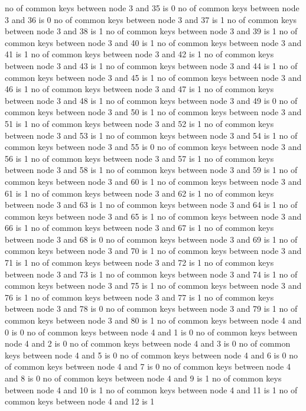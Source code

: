 no of common keys between node 3 and 35 is 0
no of common keys between node 3 and 36 is 0
no of common keys between node 3 and 37 is 1
no of common keys between node 3 and 38 is 1
no of common keys between node 3 and 39 is 1
no of common keys between node 3 and 40 is 1
no of common keys between node 3 and 41 is 1
no of common keys between node 3 and 42 is 1
no of common keys between node 3 and 43 is 1
no of common keys between node 3 and 44 is 1
no of common keys between node 3 and 45 is 1
no of common keys between node 3 and 46 is 1
no of common keys between node 3 and 47 is 1
no of common keys between node 3 and 48 is 1
no of common keys between node 3 and 49 is 0
no of common keys between node 3 and 50 is 1
no of common keys between node 3 and 51 is 1
no of common keys between node 3 and 52 is 1
no of common keys between node 3 and 53 is 1
no of common keys between node 3 and 54 is 1
no of common keys between node 3 and 55 is 0
no of common keys between node 3 and 56 is 1
no of common keys between node 3 and 57 is 1
no of common keys between node 3 and 58 is 1
no of common keys between node 3 and 59 is 1
no of common keys between node 3 and 60 is 1
no of common keys between node 3 and 61 is 1
no of common keys between node 3 and 62 is 1
no of common keys between node 3 and 63 is 1
no of common keys between node 3 and 64 is 1
no of common keys between node 3 and 65 is 1
no of common keys between node 3 and 66 is 1
no of common keys between node 3 and 67 is 1
no of common keys between node 3 and 68 is 0
no of common keys between node 3 and 69 is 1
no of common keys between node 3 and 70 is 1
no of common keys between node 3 and 71 is 1
no of common keys between node 3 and 72 is 1
no of common keys between node 3 and 73 is 1
no of common keys between node 3 and 74 is 1
no of common keys between node 3 and 75 is 1
no of common keys between node 3 and 76 is 1
no of common keys between node 3 and 77 is 1
no of common keys between node 3 and 78 is 0
no of common keys between node 3 and 79 is 1
no of common keys between node 3 and 80 is 1
no of common keys between node 4 and 0 is 0
no of common keys between node 4 and 1 is 0
no of common keys between node 4 and 2 is 0
no of common keys between node 4 and 3 is 0
no of common keys between node 4 and 5 is 0
no of common keys between node 4 and 6 is 0
no of common keys between node 4 and 7 is 0
no of common keys between node 4 and 8 is 0
no of common keys between node 4 and 9 is 1
no of common keys between node 4 and 10 is 1
no of common keys between node 4 and 11 is 1
no of common keys between node 4 and 12 is 1
